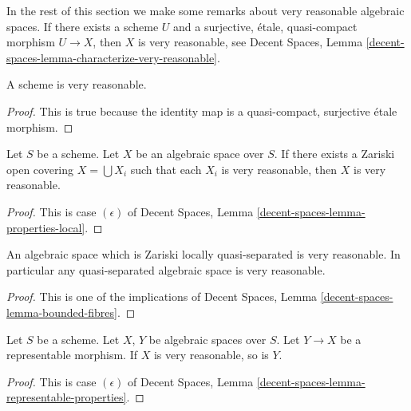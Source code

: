 \noindent
In the rest of this section we make some remarks about very reasonable
algebraic spaces. If there exists a scheme $U$ and a
surjective, \'etale, quasi-compact
morphism $U \to X$, then $X$ is very reasonable, see
Decent Spaces, Lemma \ref{decent-spaces-lemma-characterize-very-reasonable}.

\begin{lemma}
\label{lemma-scheme-very-reasonable}
A scheme is very reasonable.
\end{lemma}

\begin{proof}
This is true because the identity map is a quasi-compact, surjective
\'etale morphism.
\end{proof}

\begin{lemma}
\label{lemma-very-reasonable-Zariski-local}
Let $S$ be a scheme.
Let $X$ be an algebraic space over $S$.
If there exists a Zariski open covering $X = \bigcup X_i$ such that
each $X_i$ is very reasonable, then $X$ is very reasonable.
\end{lemma}

\begin{proof}
This is case $(\epsilon)$ of
Decent Spaces, Lemma \ref{decent-spaces-lemma-properties-local}.
\end{proof}

\begin{lemma}
\label{lemma-quasi-separated-very-reasonable}
An algebraic space which is Zariski locally quasi-separated is very reasonable.
In particular any quasi-separated algebraic space is very reasonable.
\end{lemma}

\begin{proof}
This is one of the implications of
Decent Spaces, Lemma \ref{decent-spaces-lemma-bounded-fibres}.
\end{proof}

\begin{lemma}
\label{lemma-representable-very-reasonable}
Let $S$ be a scheme.
Let $X$, $Y$ be algebraic spaces over $S$.
Let $Y \to X$ be a representable morphism.
If $X$ is very reasonable, so is $Y$.
\end{lemma}

\begin{proof}
This is case $(\epsilon)$ of
Decent Spaces, Lemma \ref{decent-spaces-lemma-representable-properties}.
\end{proof}

